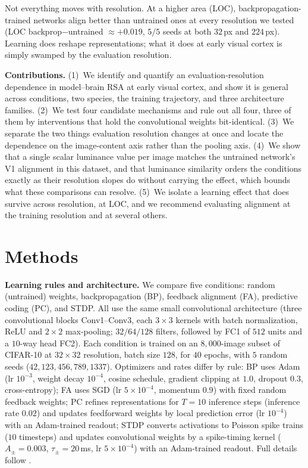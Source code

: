 \documentclass[10pt,twocolumn]{article}
\begin{document}
Not everything moves with resolution. At a higher area (LOC), backpropagation-trained networks align better than untrained ones at every resolution we tested (LOC backprop$-$untrained $\approx +0.019$, $5/5$ seeds at both $32$\,px and $224$\,px). Learning does reshape representations; what it does at early visual cortex is simply swamped by the evaluation resolution.

\textbf{Contributions.} (1)~We identify and quantify an evaluation-resolution dependence in model--brain RSA at early visual cortex, and show it is general across conditions, two species, the training trajectory, and three architecture families. (2)~We test four candidate mechanisms and rule out all four, three of them by interventions that hold the convolutional weights bit-identical. (3)~We separate the two things evaluation resolution changes at once and locate the dependence on the image-content axis rather than the pooling axis. (4)~We show that a single scalar luminance value per image matches the untrained network's V1 alignment in this dataset, and that luminance similarity orders the conditions exactly as their resolution slopes do without carrying the effect, which bounds what these comparisons can resolve. (5)~We isolate a learning effect that does survive across resolution, at LOC, and we recommend evaluating alignment at the training resolution and at several others.

\section{Methods}

\textbf{Learning rules and architecture.} We compare five conditions: random (untrained) weights, backpropagation (BP), feedback alignment (FA), predictive coding (PC), and STDP. All use the same small convolutional architecture (three convolutional blocks Conv1--Conv3, each $3\times3$ kernels with batch normalization, ReLU and $2\times2$ max-pooling; $32/64/128$ filters, followed by FC1 of $512$ units and a $10$-way head FC2). Each condition is trained on an $8{,}000$-image subset of CIFAR-10 at $32\times32$ resolution, batch size $128$, for $40$ epochs, with $5$ random seeds ($42, 123, 456, 789, 1337$). Optimizers and rates differ by rule: BP uses Adam (lr $10^{-3}$, weight decay $10^{-4}$, cosine schedule, gradient clipping at $1.0$, dropout $0.3$, cross-entropy); FA uses SGD (lr $5\times10^{-4}$, momentum $0.9$) with fixed random feedback weights; PC refines representations for $T=10$ inference steps (inference rate $0.02$) and updates feedforward weights by local prediction error (lr $10^{-4}$) with an Adam-trained readout; STDP converts activations to Poisson spike trains ($10$ timesteps) and updates convolutional weights by a spike-timing kernel ($A_\pm=0.003$, $\tau_\pm=20$\,ms, lr $5\times10^{-4}$) with an Adam-trained readout. Full details follow \citet{leutenegger2026}.
\end{document}
